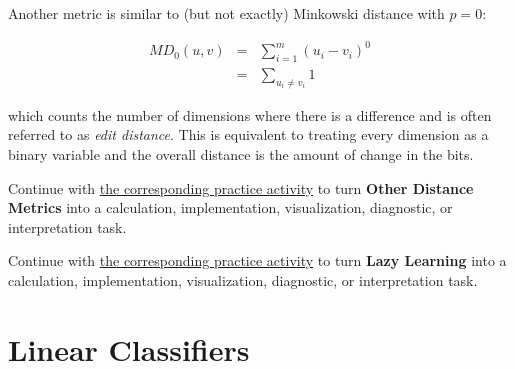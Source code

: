 \documentclass[
  letterpaper,
]{scrbook}
\begin{document}
Another metric is similar to (but not exactly) Minkowski distance with
\(p=0\):

\[\begin{aligned}
  MD_0(u, v)
  & = & \sum_{i=1}^{m} (u_i - v_i)^0 \\
  & = & \sum_{u_i \ne v_i} 1
\end{aligned}\]

which counts the number of dimensions where there is a difference and is
often referred to as \emph{edit distance}. This is equivalent to
treating every dimension as a binary variable and the overall distance
is the amount of change in the bits.

\begin{tcolorbox}[enhanced jigsaw, arc=.35mm, bottomrule=.15mm, bottomtitle=1mm, breakable, colback=white, colbacktitle=quarto-callout-tip-color!10!white, colframe=quarto-callout-tip-color-frame, coltitle=black, left=2mm, leftrule=.75mm, opacityback=0, opacitybacktitle=0.6, rightrule=.15mm, title=\textcolor{quarto-callout-tip-color}{\faLightbulb}\hspace{0.5em}{Put it into practice}, titlerule=0mm, toprule=.15mm, toptitle=1mm]

Continue with \hyperref[sec-pr-07-other-distance-metrics]{the
corresponding practice activity} to turn \textbf{Other Distance Metrics}
into a calculation, implementation, visualization, diagnostic, or
interpretation task.

\end{tcolorbox}

\begin{tcolorbox}[enhanced jigsaw, arc=.35mm, bottomrule=.15mm, bottomtitle=1mm, breakable, colback=white, colbacktitle=quarto-callout-tip-color!10!white, colframe=quarto-callout-tip-color-frame, coltitle=black, left=2mm, leftrule=.75mm, opacityback=0, opacitybacktitle=0.6, rightrule=.15mm, title=\textcolor{quarto-callout-tip-color}{\faLightbulb}\hspace{0.5em}{Put it into practice}, titlerule=0mm, toprule=.15mm, toptitle=1mm]

Continue with \hyperref[sec-pr-07-lazy-learning]{the corresponding
practice activity} to turn \textbf{Lazy Learning} into a calculation,
implementation, visualization, diagnostic, or interpretation task.

\end{tcolorbox}

\section{Linear Classifiers}\label{linear-classifiers}
\end{document}
